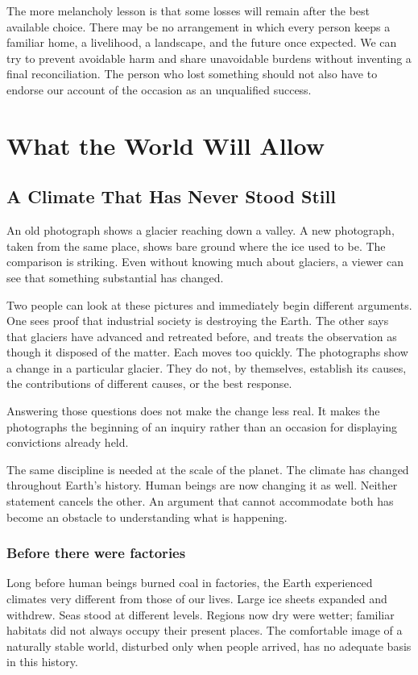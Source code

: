 \documentclass[12pt,a4paper]{book}
\begin{document}
The more melancholy lesson is that some losses will remain after the best available choice. There may be no arrangement in which every person keeps a familiar home, a livelihood, a landscape, and the future once expected. We can try to prevent avoidable harm and share unavoidable burdens without inventing a final reconciliation. The person who lost something should not also have to endorse our account of the occasion as an unqualified success.

\part{What the World Will Allow}

\chapter{A Climate That Has Never Stood Still}

An old photograph shows a glacier reaching down a valley. A new photograph, taken from the same place, shows bare ground where the ice used to be. The comparison is striking. Even without knowing much about glaciers, a viewer can see that something substantial has changed.

Two people can look at these pictures and immediately begin different arguments. One sees proof that industrial society is destroying the Earth. The other says that glaciers have advanced and retreated before, and treats the observation as though it disposed of the matter. Each moves too quickly. The photographs show a change in a particular glacier. They do not, by themselves, establish its causes, the contributions of different causes, or the best response.

Answering those questions does not make the change less real. It makes the photographs the beginning of an inquiry rather than an occasion for displaying convictions already held.

The same discipline is needed at the scale of the planet. The climate has changed throughout Earth's history. Human beings are now changing it as well. Neither statement cancels the other. An argument that cannot accommodate both has become an obstacle to understanding what is happening.

\section*{Before there were factories}

Long before human beings burned coal in factories, the Earth experienced climates very different from those of our lives. Large ice sheets expanded and withdrew. Seas stood at different levels. Regions now dry were wetter; familiar habitats did not always occupy their present places. The comfortable image of a naturally stable world, disturbed only when people arrived, has no adequate basis in this history.
\end{document}
